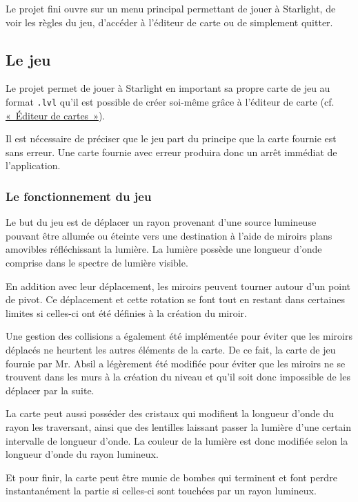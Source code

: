\documentclass[]{report}
\begin{document}
Le projet fini ouvre sur un menu principal permettant
de jouer à Starlight, de voir les règles du jeu, d'accéder à l'éditeur de 
carte ou de simplement quitter.

\subsection{Le jeu}

Le projet permet de jouer à Starlight en important sa propre carte de jeu
au format \texttt{.lvl} qu'il est possible de créer soi-même grâce à l'éditeur
de carte (cf. \hyperref[Editeur]{«~Éditeur de cartes~»}).

Il est nécessaire de préciser que le jeu part du principe que la carte 
fournie est sans erreur. Une carte fournie avec erreur produira donc
un arrêt immédiat de l'application.

\subsubsection{Le fonctionnement du jeu}

Le but du jeu est de déplacer un rayon provenant d'une source lumineuse
pouvant être allumée ou éteinte
vers une destination à l'aide de miroirs plans amovibles réfléchissant
la lumière.
La lumière possède une longueur d'onde comprise dans le spectre
de lumière visible.

En addition avec leur déplacement, les miroirs peuvent tourner
autour d'un point de pivot.
Ce déplacement et cette rotation se font tout en restant
dans certaines limites si celles-ci ont été définies à la création du miroir.

Une gestion des collisions a également été implémentée pour
éviter que les miroirs déplacés ne heurtent les autres éléments de la carte.
De ce fait, la carte de jeu fournie par Mr. Absil a légèrement été modifiée
pour éviter que les miroirs ne se trouvent dans les murs à la création du niveau
et qu'il soit donc impossible de les déplacer par la suite.

La carte peut aussi posséder des cristaux qui modifient la longueur d'onde
du rayon les traversant, ainsi que des lentilles laissant passer la lumière
d'une certain intervalle de longueur d'onde.
La couleur de la lumière est donc modifiée selon la longueur d'onde 
du rayon lumineux.

Et pour finir, la carte peut être munie de bombes qui terminent et font perdre
instantanément la partie si celles-ci sont touchées par un rayon lumineux. 
\end{document}
